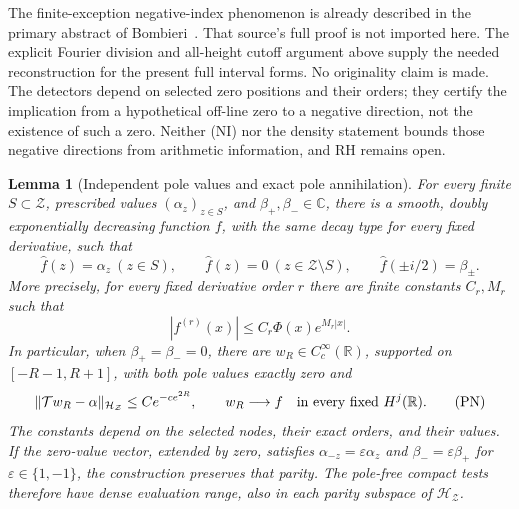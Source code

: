 \documentclass[11pt]{article}
\newtheorem{lemma}[theorem]{Lemma}
\theoremstyle{remark}\newtheorem{remark}[theorem]{Remark}
\newcommand{\R}{\mathbb R}
\newcommand{\C}{\mathbb C}
\begin{document}
The finite-exception negative-index phenomenon is already described
in the primary abstract of Bombieri~\cite{BombieriWeil}. That source's
full proof is not imported here. The explicit Fourier division and
all-height cutoff argument above supply the needed reconstruction
for the present full interval forms. No originality claim is made.
The detectors depend on selected zero positions and their orders;
they certify the implication from a hypothetical off-line zero to
a negative direction, not the existence of such a zero.
Neither (NI) nor the density statement bounds those negative
directions from arithmetic information, and RH remains open.

\begin{lemma}[Independent pole values and exact pole annihilation]
\label{lem:pole-free-interpolation}
For every finite $S\subset\mathcal Z$, prescribed values
$(\alpha_z)_{z\in S}$, and $\beta_+,\beta_-\in\C$, there is a
smooth, doubly exponentially decreasing function $f$, with the same
decay type for every fixed derivative, such that
\[
 \widehat f(z)=\alpha_z\ (z\in S),\qquad
 \widehat f(z)=0\ (z\in\mathcal Z\setminus S),\qquad
 \widehat f(\pm i/2)=\beta_\pm.
\]
More precisely, for every fixed derivative order $r$ there are
finite constants $C_r,M_r$ such that
\[
 |f^{(r)}(x)|\le C_r\Phi(x)e^{M_r|x|}.                 \tag{PNR}
\]
In particular, when $\beta_+=\beta_-=0$, there are
$w_R\in C_c^\infty(\R)$, supported on $[-R-1,R+1]$,
with both pole values exactly zero and
\[
 \|\mathcal T w_R-\alpha\|_{\mathcal H_{\mathcal Z}}
          \le C e^{-c e^{2R}},\qquad
 w_R\longrightarrow f\quad\hbox{in every fixed }H^j(\R).
                                                               \tag{PN}
\]
The constants depend on the selected nodes, their exact orders,
and their values. If the zero-value vector, extended by zero,
satisfies $\alpha_{-z}=\varepsilon\alpha_z$ and
$\beta_-=\varepsilon\beta_+$ for $\varepsilon\in\{1,-1\}$,
the construction preserves that parity.
The pole-free compact tests therefore have dense evaluation range,
also in each parity subspace of $\mathcal H_{\mathcal Z}$.
\end{lemma}
\end{document}
